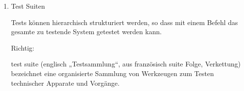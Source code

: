 \documentclass{lehramt-informatik-aufgabe}
\begin{document}
\begin{enumerate}
Ein fehlgeschlagener Test und ein Testausführungsfehler bezeichnen
denselben Sachverhalt.

\begin{liAntwort}
Falsch:

Fehler (Error)

Der Software-Test konnte durchgeführt werden, das ermittelte
Ist-Ergebnis und das vorgegebene Soll-Ergebnis weichen jedoch
voneinander ab. Ein derartiger Fehler liegt z. B. dann vor, wenn ein
Funktionsaufruf einen abweichenden Wert berechnet.

Fehlschlag (Failure)

Während der Testdurchführung wurde ein Systemversagen festgestellt. Ein
Fehlschlag liegt z. B. dann vor, wenn das zu testende System einen
Programmabsturz verursacht und hierdurch erst gar kein Ist-Ergebnis
ermittelt werden konnte.\footcite{hoffmann:software}

Das Misslingen kann als Ursache einen Fehler (Error) oder ein falsches
Ergebnis (Failure) haben, die beide per Exception signalisiert werden.
Der Unterschied zwischen den beiden Begriffen liegt darin, dass Failures
erwartet werden, während Errors eher unerwartet auftreten.

\end{liAntwort}


\item Test Suiten

Tests können hierarchisch strukturiert werden, so dass mit einem Befehl
das gesamte zu testende System getestet werden kann.

\begin{liAntwort}
Richtig:

test suite (englisch „Testsammlung“, aus französisch suite Folge,
Verkettung) bezeichnet eine organisierte Sammlung von Werkzeugen zum
Testen technischer Apparate und Vorgänge.
\end{liAntwort}

\end{enumerate}
\end{document}
